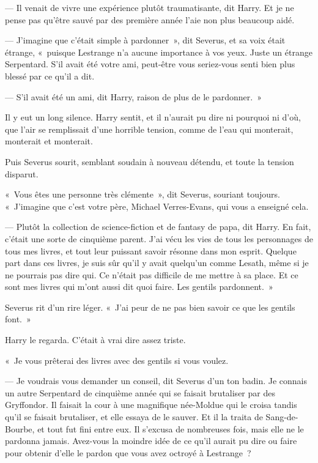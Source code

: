 --- Il venait de vivre une expérience plutôt traumatisante, dit Harry. Et je ne pense pas qu'être sauvé par des première année l'aie non plus beaucoup aidé.

--- J'imagine que c'était simple à pardonner~», dit Severus, et sa voix était étrange, «~puisque Lestrange n'a aucune importance à vos yeux. Juste un étrange Serpentard. S'il avait été votre ami, peut-être vous seriez-vous senti bien plus blessé par ce qu'il a dit.

--- S'il avait été un ami, dit Harry, raison de plus de le pardonner.~»

Il y eut un long silence. Harry sentit, et il n'aurait pu dire ni pourquoi ni d'où, que l'air se remplissait d'une horrible tension, comme de l'eau qui monterait, monterait et monterait.

Puis Severus sourit, semblant soudain à nouveau détendu, et toute la tension disparut.

«~Vous êtes une personne très clémente~», dit Severus, souriant toujours. «~J'imagine que c'est votre père, Michael Verres-Evans, qui vous a enseigné cela.

--- Plutôt la collection de science-fiction et de fantasy de papa, dit Harry. En fait, c'était une sorte de cinquième parent. J'ai vécu les vies de tous les personnages de tous mes livres, et tout leur puissant savoir résonne dans mon esprit. Quelque part dans ces livres, je suis sûr qu'il y avait quelqu'un comme Lesath, même si je ne pourrais pas dire qui. Ce n'était pas difficile de me mettre à sa place. Et ce sont mes livres qui m'ont aussi dit quoi faire. Les gentils pardonnent.~»

Severus rit d'un rire léger. «~J'ai peur de ne pas bien savoir ce que les gentils font.~»

Harry le regarda. C'était à vrai dire assez triste.

«~Je vous prêterai des livres avec des gentils si vous voulez.

--- Je voudrais vous demander un conseil, dit Severus d'un ton badin. Je connais un autre Serpentard de cinquième année qui se faisait brutaliser par des Gryffondor. Il faisait la cour à une magnifique née-Moldue qui le croisa tandis qu'il se faisait brutaliser, et elle essaya de le sauver. Et il la traita de Sang-de-Bourbe, et tout fut fini entre eux. Il s'excusa de nombreuses fois, mais elle ne le pardonna jamais. Avez-vous la moindre idée de ce qu'il aurait pu dire ou faire pour obtenir d'elle le pardon que vous avez octroyé à Lestrange~?

